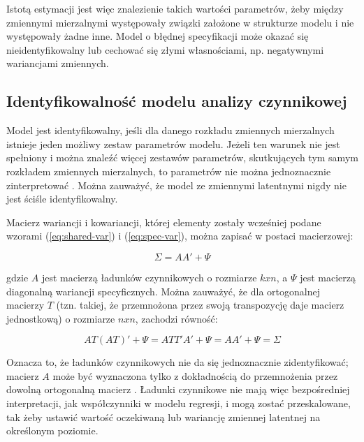 \documentclass[12pt]{article}
\begin{document}
Istotą estymacji jest więc znalezienie takich wartości parametrów, żeby między zmiennymi mierzalnymi występowały związki założone w strukturze modelu i nie występowały żadne inne. Model o błędnej specyfikacji może okazać się nieidentyfikowalny lub cechować się złymi własnościami, np. negatywnymi wariancjami zmiennych.

\hypertarget{identyfikowalnoux15bux107-modelu-analizy-czynnikowej}{%
\subsection{Identyfikowalność modelu analizy czynnikowej}\label{identyfikowalnoux15bux107-modelu-analizy-czynnikowej}}

Model jest identyfikowalny, jeśli dla danego rozkładu zmiennych mierzalnych istnieje jeden możliwy zestaw parametrów modelu. Jeżeli ten warunek nie jest spełniony i można znaleźć więcej zestawów parametrów, skutkujących tym samym rozkładem zmiennych mierzalnych, to parametrów nie można jednoznacznie zinterpretować \citep{ESSEduNet}. Można zauważyć, że model ze zmiennymi latentnymi nigdy nie jest ściśle identyfikowalny.

Macierz wariancji i kowariancji, której elementy zostały wcześniej podane wzorami (\ref{eq:shared-var}) i (\ref{eq:spec-var}), można zapisać w postaci macierzowej:

\begin{equation}
\label{eq:var-matrix}
\Sigma = A A' + \Psi
\end{equation}

gdzie \(A\) jest macierzą ładunków czynnikowych o rozmiarze \(k x n\), a \(\Psi\) jest macierzą diagonalną wariancji specyficznych. Można zauważyć, że dla ortogonalnej macierzy \(T\) (tzn. takiej, że przemnożona przez swoją transpozycję daje macierz jednostkową) o rozmiarze \(n x n\), zachodzi równość:

\begin{equation}
\label{eq:scaling}
A T (A T)' + \Psi = A T T' A' + \Psi = A A' + \Psi = \Sigma
\end{equation}

Oznacza to, że ładunków czynnikowych nie da się jednoznacznie zidentyfikować; macierz \(A\) może być wyznaczona tylko z dokładnością do przemnożenia przez dowolną ortogonalną macierz \citep{Shapiro}. Ładunki czynnikowe nie mają więc bezpośredniej interpretacji, jak współczynniki w modelu regresji, i mogą zostać przeskalowane, tak żeby ustawić wartość oczekiwaną lub wariancję zmiennej latentnej na określonym poziomie.
\end{document}
